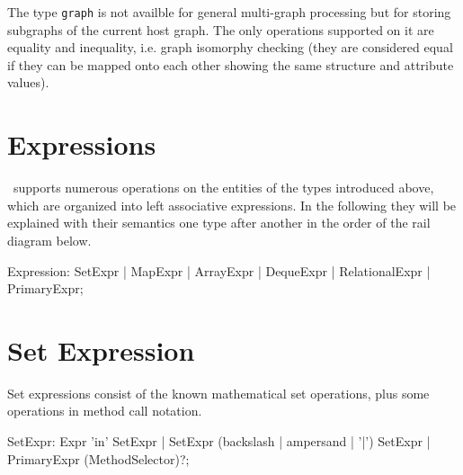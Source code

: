 The type \texttt{graph} is not availble for general multi-graph processing but for storing subgraphs of the current host graph.
The only operations supported on it are equality and inequality, i.e. graph isomorphy checking 
(they are considered equal if they can be mapped onto each other showing the same structure and attribute values).

\section{Expressions}\label{sub:containerexpr}

\GrG~supports numerous operations on the entities of the types introduced above, which are organized into left associative expressions.
In the following they will be explained with their semantics one type after another in the order of the rail diagram below.

\begin{rail}
  Expression: SetExpr | MapExpr | ArrayExpr | DequeExpr | RelationalExpr | PrimaryExpr;
\end{rail}


\section{Set Expression}\label{sec:setexpr}

Set expressions consist of the known mathematical set operations, plus some operations in method call notation.

\begin{rail}
  SetExpr: Expr 'in' SetExpr | SetExpr (backslash | ampersand | '|') SetExpr | PrimaryExpr (MethodSelector)?;
\end{rail}

